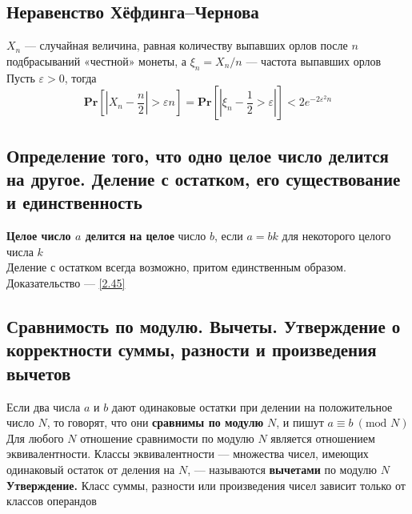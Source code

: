 \documentclass[a4paper]{article}
\newcommand{\pr}[1]{\textbf{Pr}\left[#1\right]}
\begin{document}
\subsection{Неравенство Хёфдинга–Чернова}
$X_n$ — случайная величина, равная количеству выпавших орлов после $n$ подбрасываний «честной» монеты, а $\xi_n = X_n/n$ — частота выпавших орлов\\[2mm]
\indent Пусть $\varepsilon>0$, тогда
$$\pr{\left|X_n-\frac{n}{2}\right|>\varepsilon n}=\pr{\left|\xi_n-\frac{1}{2}>\varepsilon\right|}<2e^{-2\varepsilon^2n}$$

\subsection{Определение того, что одно целое число делится на другое. Деление с остатком, его существование и единственность}
\textbf{Целое число $a$ делится на целое} число $b$, если $a = bk$ для некоторого целого числа $k$\\[2mm]
\indent Деление с остатком всегда возможно, притом единственным образом. Доказательство — \ref{2.45}

\subsection{Сравнимость по модулю. Вычеты. Утверждение о корректности суммы, разности и произведения вычетов}
Если два числа $a$ и $b$ дают одинаковые остатки при делении на положительное число $N$, то говорят, что они \textbf{сравнимы по модулю} $N$, и пишут $a \equiv b\ (\text{mod } N)$\\[2mm]
\indent Для любого $N$ отношение сравнимости по модулю $N$ является отношением эквивалентности. Классы эквивалентности — множества чисел, имеющих одинаковый остаток от деления на $N$, — называются \textbf{вычетами} по модулю $N$\\[2mm]
\indent\textbf{Утверждение.} Класс суммы, разности или произведения чисел зависит только от классов операндов
\end{document}
